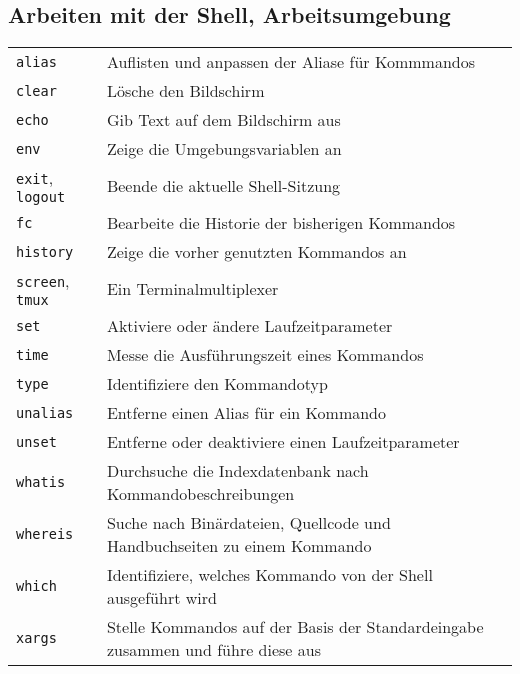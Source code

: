 \documentclass[10pt,a4paper]{article}
\begin{document}
\begin{multicols}{2}
\section{Arbeiten mit der Shell, Arbeitsumgebung}
\begin{tabular}{ p{2.5cm} p{8.5cm} }
  \hline
  \texttt{alias} & Auflisten und anpassen der Aliase für Kommmandos \\
  \texttt{clear} & Lösche den Bildschirm \\
  \texttt{echo} & Gib Text auf dem Bildschirm aus \\
  \texttt{env} & Zeige die Umgebungsvariablen an \\
  \texttt{exit}, \texttt{logout} & Beende die aktuelle Shell-Sitzung \\
  \texttt{fc} & Bearbeite die Historie der bisherigen Kommandos\\
  \texttt{history} & Zeige die vorher genutzten Kommandos an \\
  \texttt{screen}, \texttt{tmux} & Ein Terminalmultiplexer \\
  \texttt{set} & Aktiviere oder ändere Laufzeitparameter \\
  \texttt{time} & Messe die Ausführungszeit eines Kommandos \\
  \texttt{type} & Identifiziere den Kommandotyp \\
  \texttt{unalias} & Entferne einen Alias für ein Kommando \\
  \texttt{unset} & Entferne oder deaktiviere einen Laufzeitparameter \\
  \texttt{whatis} & Durchsuche die Indexdatenbank nach Kommando\-beschreibungen \\
  \texttt{whereis} & Suche nach Binärdateien, Quellcode und Handbuchseiten zu einem Kommando \\
  \texttt{which} & Identifiziere, welches Kommando von der Shell ausgeführt wird\\
  \texttt{xargs} & Stelle Kommandos auf der Basis der Standardeingabe zusammen und führe diese aus \\
  \hline
\end{tabular}



\end{multicols}
\end{document}
